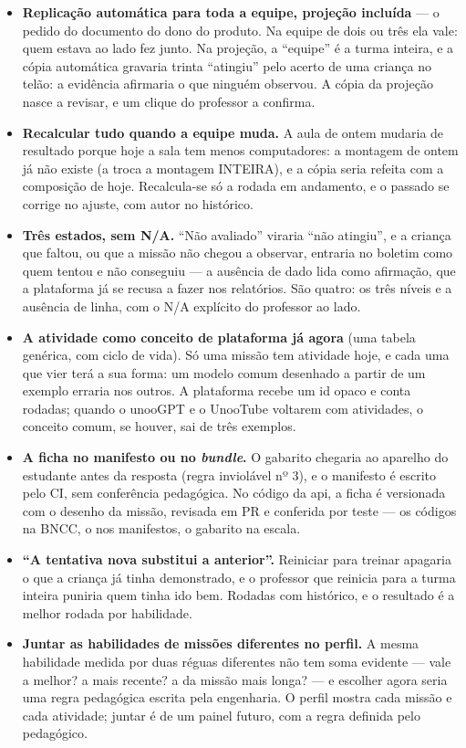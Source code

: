 \begin{itemize}
  \item \textbf{Replicação automática para toda a equipe, projeção incluída} ---
    o pedido do documento do dono do produto. Na equipe de dois ou três ela vale:
    quem estava ao lado fez junto. Na projeção, a \enquote{equipe} é a turma
    inteira, e a cópia automática gravaria trinta \enquote{atingiu} pelo acerto
    de uma criança no telão: a evidência afirmaria o que ninguém observou. A
    cópia da projeção nasce a revisar, e um clique do professor a confirma.
  \item \textbf{Recalcular tudo quando a equipe muda.} A aula de ontem mudaria
    de resultado porque hoje a sala tem menos computadores: a montagem de ontem
    já não existe (a  troca a montagem INTEIRA), e a cópia seria
    refeita com a composição de hoje. Recalcula-se só a rodada em andamento, e o
    passado se corrige no ajuste, com autor no histórico.
  \item \textbf{Três estados, sem N/A.} \enquote{Não avaliado} viraria
    \enquote{não atingiu}, e a criança que faltou, ou que a missão não chegou a
    observar, entraria no boletim como quem tentou e não conseguiu --- a
    ausência de dado lida como afirmação, que a plataforma já se recusa a fazer
    nos relatórios. São quatro: os três níveis e a ausência de linha, com o N/A
    explícito do professor ao lado.
  \item \textbf{A atividade como conceito de plataforma já agora} (uma tabela
     genérica, com ciclo de vida). Só uma missão tem atividade
    hoje, e cada uma que vier terá a sua forma: um modelo comum desenhado a
    partir de um exemplo erraria nos outros. A plataforma recebe um id opaco e
    conta rodadas; quando o unooGPT e o UnooTube voltarem com atividades, o
    conceito comum, se houver, sai de três exemplos.
  \item \textbf{A ficha no manifesto ou no \emph{bundle}.} O gabarito chegaria
    ao aparelho do estudante antes da resposta (regra inviolável nº 3), e o
    manifesto é escrito pelo CI, sem conferência pedagógica. No código da api, a
    ficha é versionada com o desenho da missão, revisada em PR e conferida por
    teste --- os códigos na BNCC, o  nos manifestos, o gabarito na
    escala.
  \item \textbf{\enquote{A tentativa nova substitui a anterior}.} Reiniciar
    para treinar apagaria o que a criança já tinha demonstrado, e o professor
    que reinicia para a turma inteira puniria quem tinha ido bem. Rodadas com
    histórico, e o resultado é a melhor rodada por habilidade.
  \item \textbf{Juntar as habilidades de missões diferentes no perfil.} A mesma
    habilidade medida por duas réguas diferentes não tem soma evidente --- vale
    a melhor? a mais recente? a da missão mais longa? --- e escolher agora seria
    uma regra pedagógica escrita pela engenharia. O perfil mostra cada missão e
    cada atividade; juntar é de um painel futuro, com a regra definida pelo
    pedagógico.
\end{itemize}

